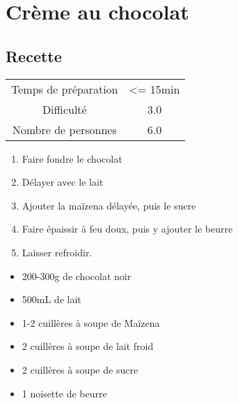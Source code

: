 \newpage
\section{Crème au chocolat}
    \label{sec:Crème au chocolat}
    \subsection{Recette}
    \vspace{1cm}


    \begin{center}
        \begin{tabular}{c|c}
            Temps de préparation & <= 15min \\
            Difficulté & 3.0 \\
            Nombre de personnes & 6.0 
        \end{tabular}
    \end{center}{}

    \vspace{1cm}
    \hline
    \vspace{1cm}

    \begin{minipage}{.7\textwidth}
        \begin{enumerate}
            \item Faire fondre le chocolat
	    \item Délayer avec le lait
	    \item Ajouter la maïzena délayée, puis le sucre
	    \item Faire épaissir à feu doux, puis y ajouter le beurre
	    \item Laisser refroidir.

        \end{enumerate}
    \end{minipage}
    \begin{minipage}{.3\textwidth}
        \begin{flushleft}
        \begin{itemize}
            \item 200-300g de chocolat noir
	    \item 500mL de lait
	    \item 1-2 cuillères à soupe de Maïzena
	    \item 2 cuillères à soupe de lait froid
	    \item 2 cuillères à soupe de sucre
	    \item 1 noisette de beurre

        \end{itemize}
        \end{flushleft}
    \end{minipage}
    
